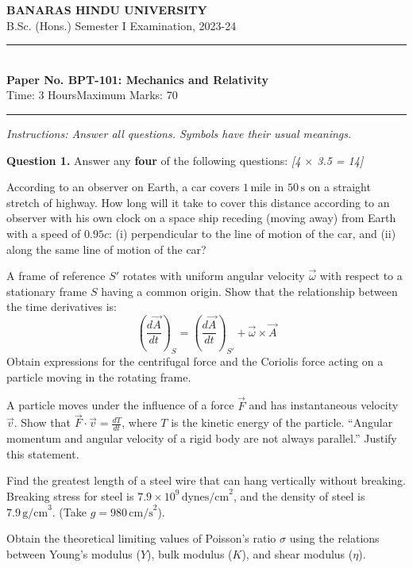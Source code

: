 \documentclass[11pt,a4paper]{article}
\newcommand{\pts}[1]{\hfill   \textit{[#1]}}
\begin{document}
\begin{center}
  {\large\bfseries BANARAS HINDU UNIVERSITY}\\[2pt]
  {\normalsize B.Sc. (Hons.) Semester I Examination, 2023-24}\\[6pt]
  \rule{0.8\linewidth}{0.5pt}\\[6pt]
  {\large\bfseries Paper No. BPT-101: Mechanics and Relativity}\\[4pt]
  {\normalsize Time: 3 Hours\hfill Maximum Marks: 70}
\end{center}
\rule{\linewidth}{0.4pt}
\smallskip



\noindent   \textit{Instructions: Answer all questions. Symbols have their usual meanings.}
\bigskip




\noindent   \textbf{Question 1.} Answer any   \textbf{four} of the following questions: \pts{4 $ \times$ 3.5 = 14}

\begin{parts}
  \item According to an observer on Earth, a car covers $1\, \text{mile}$ in $50\, \text{s}$ on a straight stretch of highway. How long will it take to cover this distance according to an observer with his own clock on a space ship receding (moving away) from Earth with a speed of $0.95c$: (i) perpendicular to the line of motion of the car, and (ii) along the same line of motion of the car?
  \item A frame of reference $S'$ rotates with uniform angular velocity $\vec{\omega}$ with respect to a stationary frame $S$ having a common origin. Show that the relationship between the time derivatives is:
    \[ \left(\frac{d\vec{A}}{dt}\right)_S = \left(\frac{d\vec{A}}{dt}\right)_{S'} + \vec{\omega}  \times \vec{A} \]
    Obtain expressions for the centrifugal force and the Coriolis force acting on a particle moving in the rotating frame.
  \item A particle moves under the influence of a force $\vec{F}$ and has instantaneous velocity $\vec{v}$. Show that $\vec{F} \cdot \vec{v} = \frac{dT}{dt}$, where $T$ is the kinetic energy of the particle. ``Angular momentum and angular velocity of a rigid body are not always parallel.'' Justify this statement.
  \item Find the greatest length of a steel wire that can hang vertically without breaking. Breaking stress for steel is $7.9  \times 10^9\, \text{dynes/cm}^2$, and the density of steel is $7.9\, \text{g/cm}^3$. (Take $g = 980\, \text{cm/s}^2$).
  \item Obtain the theoretical limiting values of Poisson's ratio $\sigma$ using the relations between Young's modulus ($Y$), bulk modulus ($K$), and shear modulus ($\eta$).
\end{parts}
\end{document}
